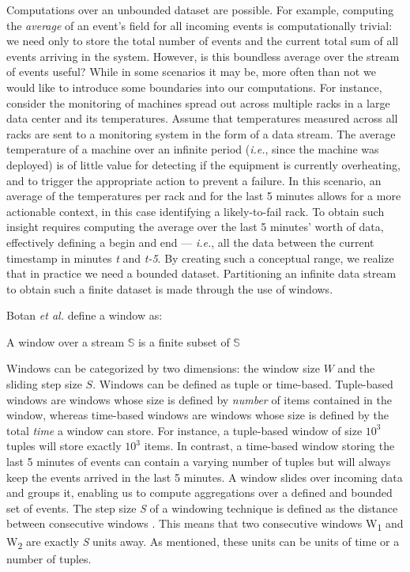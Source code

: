 Computations over an unbounded dataset are possible. For example, computing the \textit{average} of an event's field for all incoming events is computationally trivial: we need only to store the total number of events and the current total sum of all events arriving in the system. However, is this boundless average over the stream of events useful? While in some scenarios it may be, more often than not we would like to introduce some boundaries into our computations. For instance, consider the monitoring of machines spread out across multiple racks in a large data center and its temperatures. Assume that temperatures measured across all racks are sent to a monitoring system in the form of a data stream. The average temperature of a machine over an infinite period (\textit{i.e.}, since the machine was deployed) is of little value for detecting if the equipment is currently overheating, and to trigger the appropriate action to prevent a failure. In this scenario, an average of the temperatures per rack and for the last 5 minutes allows for a more actionable context, in this case identifying a likely-to-fail rack. To obtain such insight requires computing the average over the last 5 minutes' worth of data, effectively defining a begin and end --- \textit{i.e.}, all the data between the current timestamp in minutes \textit{t} and \textit{t-5}. By creating such a conceptual range, we realize that in practice we need a bounded dataset. Partitioning an infinite data stream to obtain such a finite dataset is made through the use of windows.

Botan \emph{et al.} \cite{Botan-SECRET} define a window as:
\begin{definition}
A window over a stream $\mathbb{S}$ is a finite subset of $\mathbb{S}$
\end{definition}
Windows can be categorized by two dimensions: the window size $W$ and the sliding step size $S$. Windows can be defined as tuple or time-based. Tuple-based windows are windows whose size is defined by \emph{number} of items contained in the window, whereas time-based windows are windows whose size is defined by the total \emph{time} a window can store. For instance, a tuple-based window of size $10^3$ tuples will store exactly $10^3$ items. In contrast, a time-based window storing the last 5 minutes of events can contain a varying number of tuples but will always keep the events arrived in the last 5 minutes. A window slides over incoming data and groups it, enabling us to compute aggregations over a defined and bounded set of events. The step size \textit{S} of a windowing technique is defined as the distance between consecutive windows \cite{Botan-SECRET}. This means that two consecutive windows W\textsubscript{1} and W\textsubscript{2} are exactly \textit{S} units away. As mentioned, these units can be units of time or a number of tuples.

